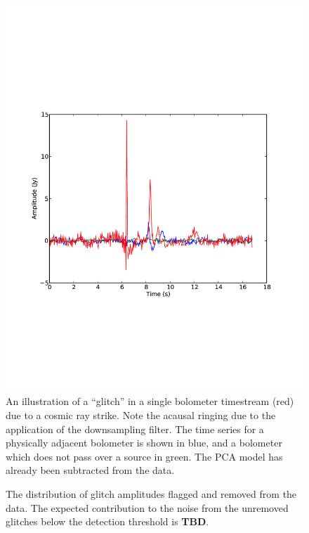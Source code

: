 \documentclass[12pt,preprint]{aastex}
\newcommand{\TBD}{{\bf TBD}}
\def\Figure#1#2#3#4{
\begin{figure}[htb]
\epsscale{#4}
\plotone{#1}
\caption{#2}
\label{#3}
\end{figure}
}
\def\FigureTwo#1#2#3#4#5{
\begin{figure}[htb]
\epsscale{#5}
\plottwo{#1}{#2}
\caption{#3}
\label{#4}
\end{figure}
}
\begin{document}
\begin{figure}
  \begin{minipage}{6.5in}
    \begin{center}
      \includegraphics[scale=0.5]{flagger_plots}
      \caption{An illustration of a ``glitch'' in a single bolometer
timestream (red) due to a cosmic ray strike.  Note the acausal ringing
due to the application of the downsampling filter.  The time series
for a physically adjacent bolometer is shown in blue, and a bolometer
which does not pass over a source in green.  The PCA model has already
been subtracted from the data.}
    \end{center}
  \end{minipage}

\end{figure}


\renewcommand{\thefigure}{\arabic{figure}}

%
\Figure{crs}{The distribution of glitch amplitudes flagged and removed
from the data.  The expected contribution to the noise from the
unremoved glitches below the detection threshold is
\TBD.}{fig:GlitchDistribution}{1.0}
\end{document}
